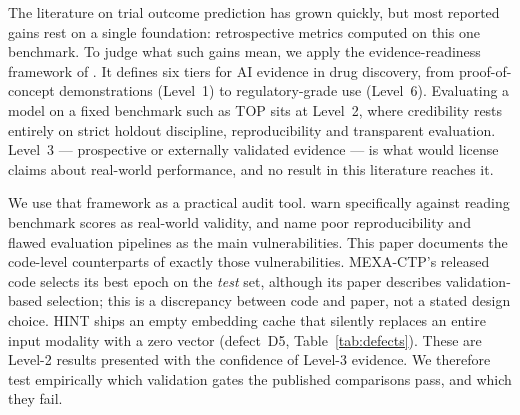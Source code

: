 \documentclass[a4paper,fleqn]{cas-sc}
\begin{document}
The literature on trial outcome prediction has grown quickly, but most reported gains rest on a
single foundation: retrospective metrics computed on this one benchmark. To judge what such gains
mean, we apply the evidence-readiness framework of \citet{yang2026large}. It defines six tiers for
AI evidence in drug discovery, from proof-of-concept demonstrations (Level~1) to regulatory-grade
use (Level~6). Evaluating a model on a fixed benchmark such as TOP sits at Level~2, where
credibility rests entirely on strict holdout discipline, reproducibility and transparent
evaluation. Level~3 --- prospective or externally validated evidence --- is what would license
claims about real-world performance, and no result in this literature reaches it.

We use that framework as a practical audit tool. \citet{yang2026large} warn specifically against
reading benchmark scores as real-world validity, and name poor reproducibility and flawed
evaluation pipelines as the main vulnerabilities. This paper documents the code-level counterparts
of exactly those vulnerabilities. MEXA-CTP's released code selects its best epoch on the
\emph{test} set, although its paper describes validation-based selection; this is a discrepancy
between code and paper, not a stated design choice. HINT ships an empty embedding cache that
silently replaces an entire input modality with a zero vector (defect~D5,
Table~\ref{tab:defects}). These are Level-2 results presented with the confidence of Level-3
evidence. We therefore test empirically which validation gates the published comparisons pass,
and which they fail.
\end{document}

